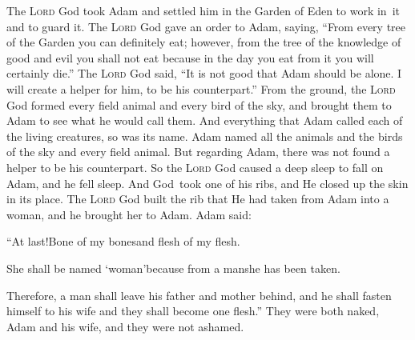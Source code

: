 \begin{inparaenum}
   The \textsc{Lord} God took Adam and settled him in the Garden of Eden to work in\understood\ it and to guard it.%
   The \textsc{Lord} God gave an order to Adam, saying, ``From every tree of the Garden you can definitely eat;%
   however, from the tree of the knowledge of good and evil you shall not eat because in the day you eat from it you will certainly die.''%
   The \textsc{Lord} God said, ``It is not good that Adam should be alone. I will create a helper for him, to be his counterpart.''%
   From the ground, the \textsc{Lord} God formed every field animal and every bird of the sky, and brought them to Adam to see what he would call them. And everything that Adam called each of the living creatures, so was its name.%
   Adam named all the animals and the birds of the sky and every field animal. But regarding Adam, there was not found a helper to be his counterpart.%
   So the \textsc{Lord} God caused a deep sleep to fall on Adam, and he fell sleep. And God\understood\ took one of his ribs, and He closed up the skin in its place.%
   The \textsc{Lord} God built the rib that He had taken from Adam into a woman, and he brought her to Adam.%
   Adam said:%
  
  \pc ``At last!\pa Bone of my bones\pa and flesh of my flesh.%
  
  \pc She shall be named `woman'\pa because from a man\pa she has been taken.%
  
   Therefore, a man shall leave his father and mother behind, and he shall fasten himself to his wife and they shall become one flesh.''%
   They were both naked, Adam and his wife, and they were not ashamed.%
\end{inparaenum}
